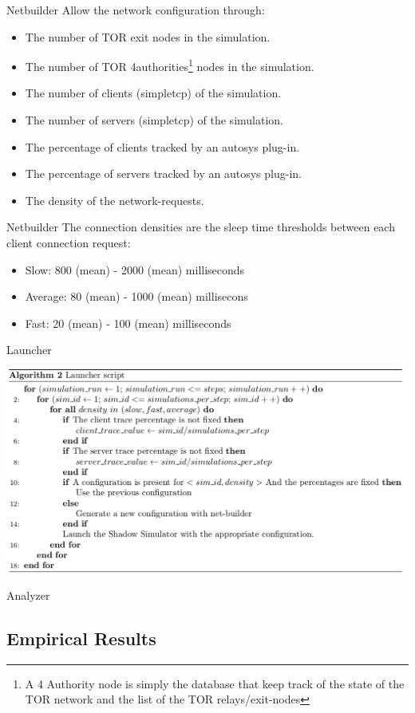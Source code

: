 	\begin{frame}{Netbuilder}
		Allow the network configuration through:
		\begin{itemize}
			
			\item The number of TOR exit nodes in the simulation.
			\item The number of TOR 4authorities\footnote{A 4 Authority node is simply the
			database that keep track of the state of the TOR network and the list
			of the TOR relays/exit-nodes} nodes in the simulation.
			\item The number of clients (simpletcp) of the simulation.
			\item The number of servers (simpletcp) of the simulation.
			\item The percentage of clients tracked by an autosys plug-in.
			\item The percentage of servers tracked by an autosys plug-in.
			\item The density of the network-requests.
		\end{itemize}
	\end{frame}	

	\begin{frame}{Netbuilder}
		The connection densities are the sleep time thresholds between each client connection request:
			
		\begin{itemize}
			\item Slow: 800 (mean) - 2000 (mean) milliseconds 			
			\item Average: 80 (mean)  - 1000 (mean) millisecons
			\item Fast: 20 (mean) - 100 (mean) milliseconds
		\end{itemize}
	\end{frame}			
	

	\begin{frame}{Launcher}
		\begin{center}
			\includegraphics[scale=0.30]{algolauncher.png}
		\end{center}				

	\end{frame}

	\begin{frame}{Analyzer}

	\end{frame}



\subsection{Empirical Results}
